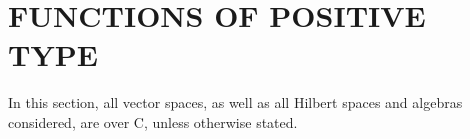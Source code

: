\section{FUNCTIONS OF POSITIVE TYPE}

In this section, all vector spaces, as well as all Hilbert spaces and algebras considered, are over C, unless otherwise stated.

